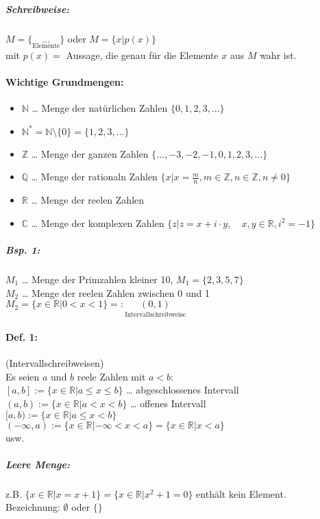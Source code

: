 \subparagraph{Schreibweise:} \parskp
$M=\{\underset{\text{Elemente}}{...}\}$ oder $M = \{ x | p(x)\}$\\
mit $p(x)=$ Aussage, die genau für die Elemente $x$ aus $M$ wahr ist.

\paragraph{Wichtige Grundmengen:}
\begin{itemize}
\item $\mathbb{N}$ … Menge der natürlichen Zahlen $\{0,1,2,3,...\}$
\item $\mathbb{N}^*=\mathbb{N}\setminus \{0\} = \{1,2,3,...\}$
\item $\mathbb{Z}$ … Menge der ganzen Zahlen $\{...,-3,-2,-1,0,1,2,3,...\}$
\item $\mathbb{Q}$ … Menge der rationaln Zahlen $\{ x | x = \frac{m}{n}, m\in \mathbb{Z}, n \in \mathbb{Z}, n\not= 0\}$
\item $\mathbb{R}$ … Menge der reelen Zahlen
\item $\mathbb{C}$ … Menge der komplexen Zahlen $\{ z | z=x+ i \cdot  y,\quad x, y \in \mathbb{R}, i^2=-1\}$
\end{itemize}

\subparagraph{Bsp. 1:} \parskp
$M_1$ … Menge der Primzahlen kleiner 10, $M_1=\{2,3,5,7\}$\\
$M_2$ … Menge der reelen Zahlen zwischen 0 und 1 $M_2=\{x \in \mathbb{R}| 0<x<1\} =: \underset{\text{Intervallschreibweise}}{(0,1)}$

\paragraph{Def. 1:} (Intervallschreibweisen) \\
Es seien $a$ und $b$ reele Zahlen mit $a<b$:\\
$[a,b]:=\{ x \in \mathbb{R} | a \le x \le b\}$ … abgeschlossenes Intervall\\
$(a,b):= \{ x \in \mathbb{R} | a < x < b\}$ … offenes Intervall\\
$[a,b):= \{ x \in \mathbb{R}  | a \le x < b\}$\\
$(-\infty , a ) := \{ x \in \mathbb{R} | - \infty < x < a \} = \{x \in \mathbb{R} | x < a\}$\\
usw.

\subparagraph{Leere Menge:} z.B. $\{ x \in \mathbb{R} | x =x+1\}= \{x \in \mathbb{R} | x^2+1=0\}$ enthält kein Element.\\
Bezeichnung: $\emptyset$ oder $\{\}$

